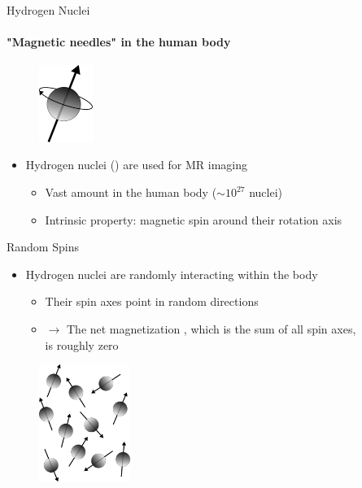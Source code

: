 \begin{frame}{Hydrogen Nuclei}
    \framesubtitle{"Magnetic needles" in the human body}

    \begin{figure}
        \centering
        \includegraphics[height=2.5cm]{images/nuclear_spin.pdf}
    \end{figure}

    \begin{itemize}
        \item Hydrogen nuclei (\hydrogen) are used for MR imaging
              \begin{itemize}
                  \item Vast amount in the human body ($\sim 10^{27}$ nuclei)
                  \item Intrinsic property: magnetic spin around their rotation axis
              \end{itemize}
    \end{itemize}
\end{frame}

\begin{frame}{Random Spins}
    \begin{itemize}
        \item Hydrogen nuclei are randomly interacting within the body
              \begin{itemize}
                  \item Their spin axes point in random directions
                  \item $\rightarrow$ The net magnetization \magn, which is the sum of all spin axes,\\ is roughly zero
              \end{itemize}
    \end{itemize}
    \begin{figure}
        \centering
        \includegraphics[height=3.8cm]{images/random_spins.pdf}
    \end{figure}

\end{frame}


